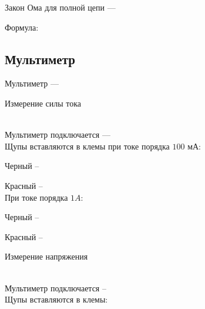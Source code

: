 Закон Ома для полной цепи --- \hrulefill

\hrulefill

\hrulefill

Формула:

%


\subsection{Мультиметр}
Мультиметр --- \hrulefill 

\hrulefill 

\hrulefill 

Измерение силы тока

\\
Мультиметр подключается --- \hrulefill
\\
Щупы вставляются в клемы при токе порядка $100$ мА:

Черный -- \hrulefill

Красный -- \hrulefill
\\
При токе порядка $1 A$:

Черный -- \hrulefill

Красный -- \hrulefill

Измерение напряжения

\\
Мультиметр подключается -- \hrulefill
\\
Щупы вставляются в клемы:

